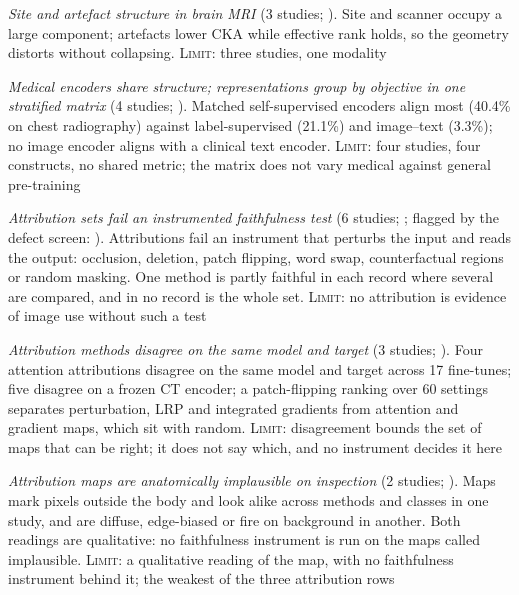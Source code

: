 \begin{description}[leftmargin=1.35em,labelsep=0.4em,itemsep=2pt,topsep=2pt,parsep=0pt]
\item[\textbf{F3c}] \emph{Site and artefact structure in brain MRI} (3 studies; \cite{mielcarz2026do,navarrogonzalez2026crossscanner,rahbar2026frozen}). Site and scanner occupy a large component; artefacts lower CKA while effective rank holds, so the geometry distorts without collapsing. \textsc{Limit:} three studies, one modality
\item[\textbf{F5b}] \emph{Medical encoders share structure; representations group by objective in one stratified matrix} (4 studies; \cite{aerts2025foundation,arasteh2026candor,folco2025semantic,tayebiarasteh2026self}). Matched self-supervised encoders align most (40.4\% on chest radiography) against label-supervised (21.1\%) and image--text (3.3\%); no image encoder aligns with a clinical text encoder. \textsc{Limit:} four studies, four constructs, no shared metric; the matrix does not vary medical against general pre-training
\item[\textbf{F8a}] \emph{Attribution sets fail an instrumented faithfulness test} (6 studies; \cite{akanova2026interpreting,bors2026benchmarking,idaji2026beyond,mcinerney2022that,sadanandan2026attention,xiong2026rethinking}; flagged by the defect screen: \cite{akanova2026interpreting}). Attributions fail an instrument that perturbs the input and reads the output: occlusion, deletion, patch flipping, word swap, counterfactual regions or random masking. One method is partly faithful in each record where several are compared, and in no record is the whole set. \textsc{Limit:} no attribution is evidence of image use without such a test
\item[\textbf{F8a$'$}] \emph{Attribution methods disagree on the same model and target} (3 studies; \cite{bors2026benchmarking,idaji2026beyond,injarabian2025interpreting}). Four attention attributions disagree on the same model and target across 17 fine-tunes; five disagree on a frozen CT encoder; a patch-flipping ranking over 60 settings separates perturbation, LRP and integrated gradients from attention and gradient maps, which sit with random. \textsc{Limit:} disagreement bounds the set of maps that can be right; it does not say which, and no instrument decides it here
\item[\textbf{F8a$^{\prime\prime}$}] \emph{Attribution maps are anatomically implausible on inspection} (2 studies; \cite{hashmi2024towards,injarabian2025interpreting}). Maps mark pixels outside the body and look alike across methods and classes in one study, and are diffuse, edge-biased or fire on background in another. Both readings are qualitative: no faithfulness instrument is run on the maps called implausible. \textsc{Limit:} a qualitative reading of the map, with no faithfulness instrument behind it; the weakest of the three attribution rows

\end{description}

